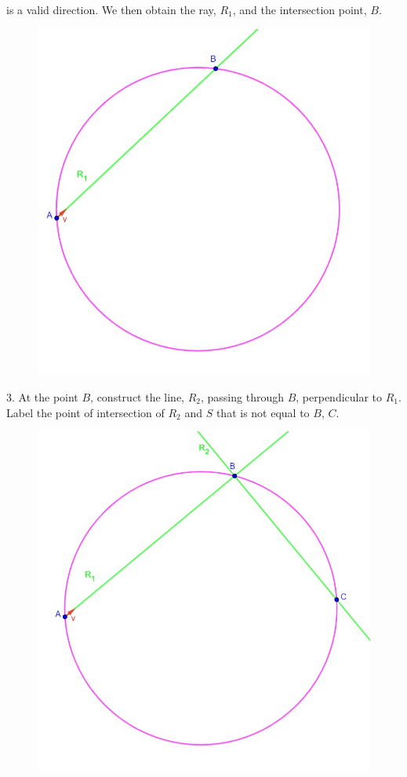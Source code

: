 \documentclass[11pt]{article}
\begin{document}
is a valid direction.
\newpage
We then obtain the ray, \(R_1\), and the intersection point, \(B\).  
\begin{center}
	\begin{figure}[h]
		\includegraphics[scale=0.5]{circle_4.jpg}
	\end{figure}
\end{center}
3. At the point \(B\), construct the line, \(R_2\), passing through \(B\), perpendicular to \(R_1\). Label the point of intersection of \(R_2\) and \(S\) that is not equal to \(B\), \(C\).
\begin{center}
	\begin{figure}[h]
		\includegraphics[scale=0.5]{circle_5.jpg}
	\end{figure}
\end{center}
\end{document}
